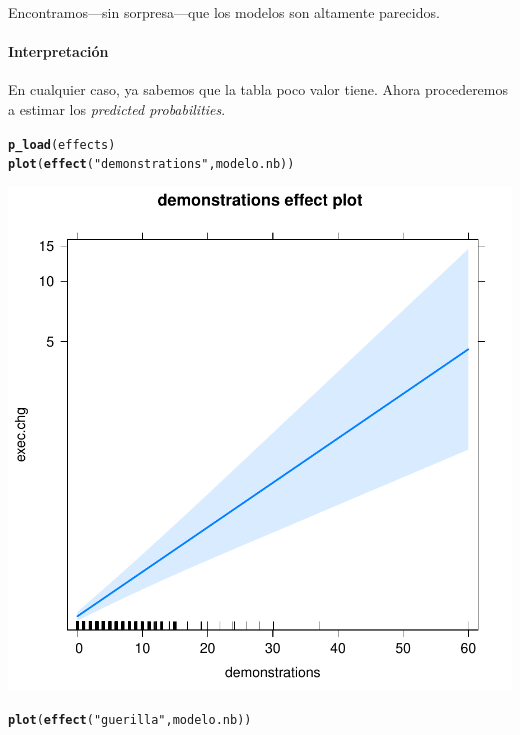 \documentclass[onesided]{article}\usepackage[]{graphicx}\usepackage[]{color}
\makeatletter
\def\maxwidth{ %
  \ifdim\Gin@nat@width>\linewidth
    \linewidth
  \else
    \Gin@nat@width
  \fi
}
\newcommand{\hlstr}[1]{\textcolor[rgb]{0.192,0.494,0.8}{#1}}%
\newcommand{\hlstd}[1]{\textcolor[rgb]{0.345,0.345,0.345}{#1}}%
\newcommand{\hlkwd}[1]{\textcolor[rgb]{0.737,0.353,0.396}{\textbf{#1}}}%
\newenvironment{kframe}{%
 \def\at@end@of@kframe{}%
 \ifinner\ifhmode%
  \def\at@end@of@kframe{\end{minipage}}%
  \begin{minipage}{\columnwidth}%
 \fi\fi%
 \def\FrameCommand##1{\hskip\@totalleftmargin \hskip-\fboxsep
 \colorbox{shadecolor}{##1}\hskip-\fboxsep
     \hskip-\linewidth \hskip-\@totalleftmargin \hskip\columnwidth}%
 \MakeFramed {\advance\hsize-\width
   \@totalleftmargin\z@ \linewidth\hsize
   \@setminipage}}%
 {\par\unskip\endMakeFramed%
 \at@end@of@kframe}
\makeatother
\begin{document}
Encontramos---sin sorpresa---que los modelos son altamente parecidos. 

\paragraph{Interpretaci\'on} En cualquier caso, ya sabemos que la tabla poco valor tiene. Ahora procederemos a estimar los \emph{predicted probabilities}.


\begin{kframe}
\begin{alltt}
\hlkwd{p_load}\hlstd{(effects)}
\hlkwd{plot}\hlstd{(}\hlkwd{effect}\hlstd{(}\hlstr{"demonstrations"}\hlstd{, modelo.nb))}
\end{alltt}
\end{kframe}

{\centering \includegraphics[width=\maxwidth]{figure/pp2-1} 

}


\begin{kframe}\begin{alltt}
\hlkwd{plot}\hlstd{(}\hlkwd{effect}\hlstd{(}\hlstr{"guerilla"}\hlstd{, modelo.nb))}
\end{alltt}
\end{kframe}
\end{document}
